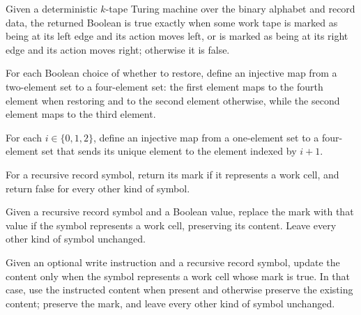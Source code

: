 \begin{definition}
\label{Turing.recordStepOutside}
\leanok
{}
Given a deterministic $k$-tape Turing machine over the binary alphabet and record data,
the returned Boolean is true exactly when some work tape is marked as being at its left
edge and its action moves left, or is marked as being at its right edge and its action
moves right; otherwise it is false.
\end{definition}

\begin{definition}
\label{Turing.recordStepSeekBank}
\leanok
For each Boolean choice of whether to restore, define an injective map from a
two-element set to a four-element set: the first element maps to the fourth element when
restoring and to the second element otherwise, while the second element maps to the
third element.
\end{definition}

\begin{definition}
\label{Turing.recordStepDigitBank}
\leanok
For each $i\in\{0,1,2\}$, define an injective map from a one-element set to a
four-element set that sends its unique element to the element indexed by $i+1$.
\end{definition}

\begin{definition}
\label{Turing.recordStepGetMark}
\leanok
{}
For a recursive record symbol, return its mark if it represents a work cell, and return
false for every other kind of symbol.
\end{definition}

\begin{definition}
\label{Turing.recordStepSetMark}
\leanok
{}
Given a recursive record symbol and a Boolean value, replace the mark with that value if
the symbol represents a work cell, preserving its content. Leave every other kind of
symbol unchanged.
\end{definition}

\begin{definition}
\label{Turing.recordStepWriteCell}
\leanok
{}
Given an optional write instruction and a recursive record symbol, update the content
only when the symbol represents a work cell whose mark is true. In that case, use the
instructed content when present and otherwise preserve the existing content; preserve
the mark, and leave every other kind of symbol unchanged.
\end{definition}

